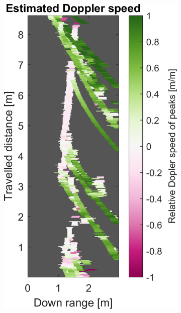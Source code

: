 \begin{figure}[htbp]
\begin{subfigure}[t]{0.475\linewidth}
        \includegraphics[width=\linewidth,max height=.475\textheight]{gfx/results/underground_doppler.png}
    \end{subfigure}\bigskip\\
    \begin{subfigure}[t]{0.475\linewidth}  
        \centering 

\end{subfigure}
\end{figure}
